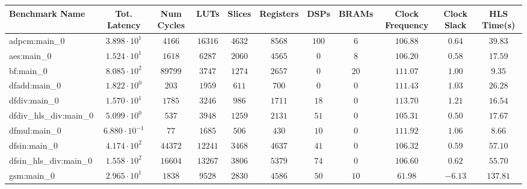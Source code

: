 \begin{tabular}{|l|c|c|c|c|c|c|c|c|c|c|}
\hline
Benchmark Name          & Tot. Latency            & Num Cycles & LUTs       & Slices    & Registers & DSPs    & BRAMs   & Clock Frequency & Clock Slack & HLS Time(s) \\
\hline
adpcm:main\_0           & $ 3.898 \cdot 10^{1}  $ & $ 4166   $ & $ 16316  $ & $ 4632  $ & $ 8568  $ & $ 100 $ & $ 6   $ & $ 106.88      $ & $ 0.64    $ & $ 39.83   $ \\
aes:main\_0             & $ 1.524 \cdot 10^{1}  $ & $ 1618   $ & $ 6287   $ & $ 2060  $ & $ 4565  $ & $ 0   $ & $ 8   $ & $ 106.20      $ & $ 0.58    $ & $ 17.59   $ \\
bf:main\_0              & $ 8.085 \cdot 10^{2}  $ & $ 89799  $ & $ 3747   $ & $ 1274  $ & $ 2657  $ & $ 0   $ & $ 20  $ & $ 111.07      $ & $ 1.00    $ & $ 9.35    $ \\
dfadd:main\_0           & $ 1.822 \cdot 10^{0}  $ & $ 203    $ & $ 1959   $ & $ 611   $ & $ 700   $ & $ 0   $ & $ 0   $ & $ 111.43      $ & $ 1.03    $ & $ 26.28   $ \\
dfdiv:main\_0           & $ 1.570 \cdot 10^{1}  $ & $ 1785   $ & $ 3246   $ & $ 986   $ & $ 1711  $ & $ 18  $ & $ 0   $ & $ 113.70      $ & $ 1.21    $ & $ 16.54   $ \\
dfdiv\_hls\_div:main\_0 & $ 5.099 \cdot 10^{0}  $ & $ 537    $ & $ 3948   $ & $ 1259  $ & $ 2131  $ & $ 51  $ & $ 0   $ & $ 105.31      $ & $ 0.50    $ & $ 17.67   $ \\
dfmul:main\_0           & $ 6.880 \cdot 10^{-1} $ & $ 77     $ & $ 1685   $ & $ 506   $ & $ 430   $ & $ 10  $ & $ 0   $ & $ 111.92      $ & $ 1.06    $ & $ 8.66    $ \\
dfsin:main\_0           & $ 4.174 \cdot 10^{2}  $ & $ 44372  $ & $ 12241  $ & $ 3468  $ & $ 4637  $ & $ 41  $ & $ 0   $ & $ 106.32      $ & $ 0.59    $ & $ 57.10   $ \\
dfsin\_hls\_div:main\_0 & $ 1.558 \cdot 10^{2}  $ & $ 16604  $ & $ 13267  $ & $ 3806  $ & $ 5379  $ & $ 74  $ & $ 0   $ & $ 106.60      $ & $ 0.62    $ & $ 55.70   $ \\
gsm:main\_0             & $ 2.965 \cdot 10^{1}  $ & $ 1838   $ & $ 9528   $ & $ 2830  $ & $ 4586  $ & $ 50  $ & $ 10  $ & $ 61.98       $ & $ -6.13   $ & $ 137.81  $ \\

\end{tabular}
